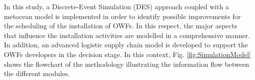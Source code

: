 In this study, a Discrete-Event Simulation (DES) approach coupled with a metocean model is implemented in order to identify possible improvements for the scheduling of the installation of OWFs. In this respect, the major aspects that influence the installation activities are modelled in a comprehensive manner. In addition, an advanced logistic supply chain model is developed to support the OWFs developers in the decision stage. In this context, Fig. \ref{fig:SimulationModel} shows the flowchart of the methodology illustrating the information flow between the different modules.